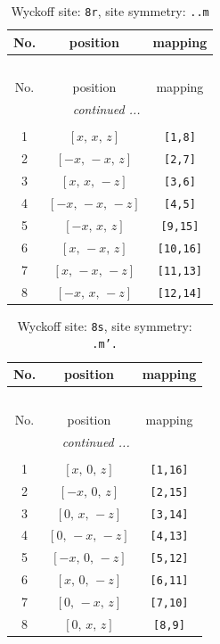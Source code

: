 \documentclass[fleqn,8pt]{jsarticle}
\begin{document}
\begin{longtable}{ccc}
\caption{Wyckoff site: {\tt 8r}, site symmetry: {\tt ..m}}
 \\
 \hline \hline
No. & position & mapping \\ \hline \endfirsthead

\multicolumn{2}{l}{\tablename\ \thetable{}} \\
 \hline \hline
No. & position & mapping \\ \hline \endhead

 \hline \hline
\multicolumn{2}{r}{\footnotesize\it continued ...} \\ \endfoot

 \hline \hline
\multicolumn{2}{r}{} \\ \endlastfoot

1 & $\left[ x,\, x,\, z \right]$ & {\tt [1,8]} \\ \hline
2 & $\left[ - x,\, - x,\, z \right]$ & {\tt [2,7]} \\ \hline
3 & $\left[ x,\, x,\, - z \right]$ & {\tt [3,6]} \\ \hline
4 & $\left[ - x,\, - x,\, - z \right]$ & {\tt [4,5]} \\ \hline
5 & $\left[ - x,\, x,\, z \right]$ & {\tt [9,15]} \\ \hline
6 & $\left[ x,\, - x,\, z \right]$ & {\tt [10,16]} \\ \hline
7 & $\left[ x,\, - x,\, - z \right]$ & {\tt [11,13]} \\ \hline
8 & $\left[ - x,\, x,\, - z \right]$ & {\tt [12,14]} \\
\end{longtable}
\renewcommand{\arraystretch}{1.2}
\begin{longtable}{ccc}
\caption{Wyckoff site: {\tt 8s}, site symmetry: {\tt .m'.}}
 \\
 \hline \hline
No. & position & mapping \\ \hline \endfirsthead

\multicolumn{2}{l}{\tablename\ \thetable{}} \\
 \hline \hline
No. & position & mapping \\ \hline \endhead

 \hline \hline
\multicolumn{2}{r}{\footnotesize\it continued ...} \\ \endfoot

 \hline \hline
\multicolumn{2}{r}{} \\ \endlastfoot

1 & $\left[ x,\, 0,\, z \right]$ & {\tt [1,16]} \\ \hline
2 & $\left[ - x,\, 0,\, z \right]$ & {\tt [2,15]} \\ \hline
3 & $\left[ 0,\, x,\, - z \right]$ & {\tt [3,14]} \\ \hline
4 & $\left[ 0,\, - x,\, - z \right]$ & {\tt [4,13]} \\ \hline
5 & $\left[ - x,\, 0,\, - z \right]$ & {\tt [5,12]} \\ \hline
6 & $\left[ x,\, 0,\, - z \right]$ & {\tt [6,11]} \\ \hline
7 & $\left[ 0,\, - x,\, z \right]$ & {\tt [7,10]} \\ \hline
8 & $\left[ 0,\, x,\, z \right]$ & {\tt [8,9]} \\
\end{longtable}
\end{document}
